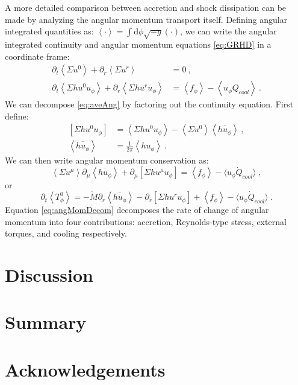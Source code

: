 \documentclass{emulateapj}
\newcommand{\Sig}{\Sigma}
\newcommand{\dd}{\mbox{d}}
\newcommand{\ave}[1]{\left \langle #1 \right \rangle}
\newcommand{\aveRe}[1]{\left [ #1 \right ]}
\begin{document}
A more detailed comparison between accretion and shock dissipation can be made by analyzing the angular momentum transport itself.  Defining angular integrated quantities as: $\ave{\cdot} = \int \dd \phi \sqrt{-g} (\cdot)$, we can write the angular integrated continuity and angular momentum equations \eqref{eq:GRHD} in a coordinate frame:
\begin{align}
	\partial_t \ave{\Sig u^0} + \partial_r \ave{\Sig u^r} &= 0 \ ,\label{eq:aveAng}\\
	\partial_t \ave{\Sig h u^0 u_\phi} + \partial_r \ave{\Sig h u^r u_\phi} &= \ave{f_\phi}- \ave{u_\phi \dot{Q}_{cool}} \ .\nonumber
\end{align} 
We can decompose \eqref{eq:aveAng} by factoring out the continuity equation.  First define:
\begin{align*}
	\aveRe{\Sig h u^0 u_\phi} &= \ave{\Sig h u^0 u_\phi} - \ave{\Sig u^0}\ave{\overline{h u_\phi}} \ , \\
	\ave{\overline{h u_\phi}} &= \frac{1}{2\pi} \ave{h u_\phi} \ .
\end{align*}
We can then write angular momentum conservation as:
\begin{equation}
	\ave{\Sig u^\mu} \partial_\mu \ave{\overline{h u_\phi}} + \partial_\mu \aveRe{\Sig h u^\mu u_\phi} =  \ave{f_\phi}- \langle u_\phi \dot{Q}_{cool} \rangle \ , 
\end{equation}
or
\begin{equation}
	\partial_t \ave{T^0_\phi} = -\dot{M} \partial_r \ave{\overline{h u_\phi}} -  \partial_r \aveRe{\Sig h u^r u_\phi} +  \ave{f_\phi}- \langle u_\phi \dot{Q}_{cool} \rangle \ . \label{eq:angMomDecom}
\end{equation} 
Equation \eqref{eq:angMomDecom} decomposes the rate of change of angular momentum into four contributions: accretion, Reynolds-type stress, external torques, and cooling respectively.







\section{Discussion}
\label{sec:discussion}




\section{Summary}
\label{sec:summary}





\section{Acknowledgements}


\newpage





%
\end{document}
